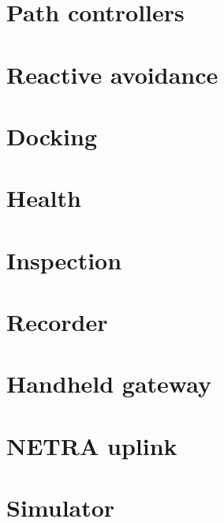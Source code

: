 \section{Path controllers}


\section{Reactive avoidance}


\section{Docking}


\section{Health}


\section{Inspection}


\section{Recorder}


\section{Handheld gateway}


\section{NETRA uplink}


\section{Simulator}

